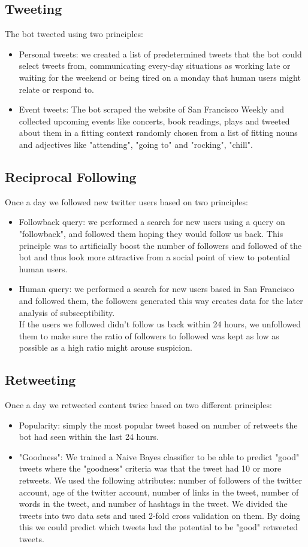 \documentclass[10pt]{IEEEtran}
\begin{document}
\subsection{Tweeting}
The bot tweeted using two principles:
\begin{itemize}
\item Personal tweets: we created a list of predetermined tweets that the bot could select tweets from, communicating every-day situations as working late or waiting for the weekend or being tired on a monday that human users might relate or respond to.
\item Event tweets: The bot scraped the website of San Francisco Weekly and collected upcoming events like concerts, book readings, plays and tweeted about them in a fitting context randomly chosen from a list of fitting nouns and adjectives like "attending", "going to" and "rocking", "chill".
\end{itemize}
\subsection{Reciprocal Following}
Once a day we followed new twitter users based on two principles:
\begin{itemize}
\item Followback query: we performed a search for new users using a query on "followback", and followed them hoping they would follow us back. This principle was to artificially boost the number of followers and followed of the bot and thus look more attractive from a social point of view to potential human users.
\item Human query: we performed a search for new users based in San Francisco and followed them, the followers generated this way creates data for the later analysis of subsceptibility.\\
 If the users we followed didn't follow us back within 24 hours, we unfollowed them to make sure the ratio of followers to followed was kept as low as possible as a high ratio might arouse suspicion.
\end{itemize}
\subsection{Retweeting}
Once a day we retweeted content twice based on two different principles:
\begin{itemize}
\item Popularity: simply the most popular tweet based on number of retweets the bot had seen within the last 24 hours.
\item "Goodness": We trained a Naive Bayes classifier to be able to predict "good" tweets where the "goodness" criteria was that the tweet had 10 or more retweets. We used the following attributes: number of followers of the twitter account, age of the twitter account, number of links in the tweet, number of words in the tweet, and number of hashtags in the tweet. We divided the tweets into two data sets and used 2-fold cross validation on them. By doing this we could predict which tweets had the potential to be "good" retweeted tweets.
\end{itemize}
\end{document}
